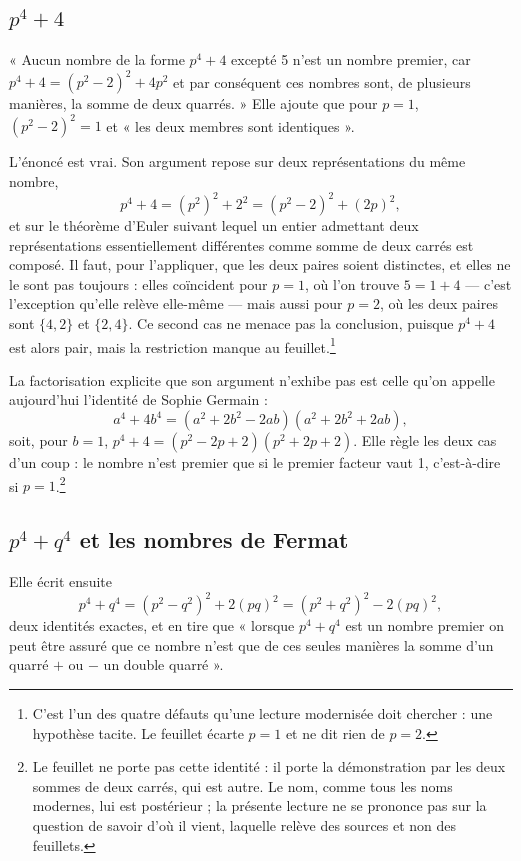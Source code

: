 \documentclass[11pt,a4paper]{article}
\begin{document}
\subsection*{$p^4 + 4$}

« Aucun nombre de la forme $p^4+4$ excepté 5 n'est un nombre premier, car
$p^4+4 = (p^2-2)^2 + 4p^2$ et par conséquent ces nombres sont, de plusieurs
manières, la somme de deux quarrés. » Elle ajoute que pour $p = 1$,
$(p^2-2)^2 = 1$ et « les deux membres sont identiques ».

L'énoncé est vrai. Son argument repose sur deux représentations du même
nombre,
\[
  p^4 + 4 = (p^2)^2 + 2^2 = (p^2-2)^2 + (2p)^2 ,
\]
et sur le théorème d'Euler suivant lequel un entier admettant deux
représentations essentiellement différentes comme somme de deux carrés est
composé. Il faut, pour l'appliquer, que les deux paires soient distinctes, et
elles ne le sont pas toujours : elles coïncident pour $p = 1$, où l'on trouve
$5 = 1 + 4$ — c'est l'exception qu'elle relève elle-même — mais aussi pour
$p = 2$, où les deux paires sont $\{4,2\}$ et $\{2,4\}$. Ce second cas ne
menace pas la conclusion, puisque $p^4+4$ est alors pair, mais la restriction
manque au feuillet.\footnote{C'est l'un des quatre défauts qu'une lecture
modernisée doit chercher : une hypothèse tacite. Le feuillet écarte $p=1$ et
ne dit rien de $p=2$.}

La factorisation explicite que son argument n'exhibe pas est celle qu'on
appelle aujourd'hui l'identité de Sophie Germain :
\[
  a^4 + 4b^4 = \left(a^2 + 2b^2 - 2ab\right)\left(a^2 + 2b^2 + 2ab\right),
\]
soit, pour $b = 1$, $p^4 + 4 = (p^2-2p+2)(p^2+2p+2)$. Elle règle les deux cas
d'un coup : le nombre n'est premier que si le premier facteur vaut 1,
c'est-à-dire si $p = 1$.\footnote{Le feuillet ne porte pas cette identité : il
porte la démonstration par les deux sommes de deux carrés, qui est autre. Le
nom, comme tous les noms modernes, lui est postérieur ; la présente lecture ne
se prononce pas sur la question de savoir d'où il vient, laquelle relève des
sources et non des feuillets.}

\subsection*{$p^4 + q^4$ et les nombres de Fermat}

Elle écrit ensuite
\[
  p^4 + q^4 = \left(p^2 - q^2\right)^2 + 2(pq)^2 = \left(p^2 + q^2\right)^2 - 2(pq)^2 ,
\]
deux identités exactes, et en tire que « lorsque $p^4+q^4$ est un nombre
premier on peut être assuré que ce nombre n'est que de ces seules manières la
somme d'un quarré $+$ ou $-$ un double quarré ».
\end{document}
